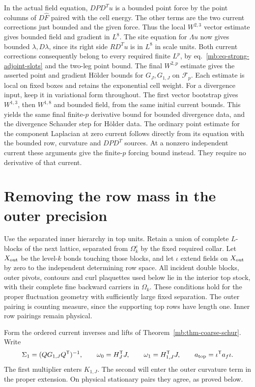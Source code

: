 \documentclass[11pt,letterpaper,reqno]{amsart}
\numberwithin{equation}{section}
\renewcommand{\eqref}[1]{\textup{eq.~\ref{#1}}}
\theoremstyle{definition}
\theoremstyle{remark}
\begin{document}
In the actual field equation, \(DPD^T u\) is a bounded point force by the point columns of \(D\widehat F\) paired with the cell energy. The other terms are the two current corrections just bounded and the given force. Thus the local \(W^{2,3}\) vector estimate gives bounded field and gradient in \(L^8\). The site equation for \(\Lambda u\) now gives bounded \(\lambda,D\lambda\), since its right side \(R D^T u\) is in \(L^8\) in scale units. Both current corrections consequently belong to every required finite \(L^p\), by \eqref{mb:eq-strong-adjoint-slots} and the two-leg point bound. The final \(W^{2,p}\) estimate gives the asserted point and gradient H\"older bounds for \(G_J,G_{1,J}\) on \(\mathcal F_p\). Each estimate is local on fixed boxes and retains the exponential cell weight. For a divergence input, keep it in variational form throughout. The first vector bootstrap gives \(W^{1,3}\), then \(W^{1,8}\) and bounded field, from the same initial current bounds. This yields the same final finite-\(p\) derivative bound for bounded divergence data, and the divergence Schauder step for H\"older data. The ordinary point estimate for the component Laplacian at zero current follows directly from its equation with the bounded row, curvature and \(DPD^T\) sources. At a nonzero independent current these arguments give the finite-\(p\) forcing bound instead. They require no derivative of that current.


\section{Removing the row mass in the outer precision}
\label{mb:sec-physical-gap}

Use the separated inner hierarchy in top units. Retain a
union of complete \(L\)-blocks of the next lattice, separated
from \(\Omega_k^c\) by the fixed required collar. Let \(X_{\rm out}\)
be the level-\(k\) bonds touching those blocks, and let
\(\iota\) extend fields on \(X_{\rm out}\) by zero to the
independent determining row space. All incident double
blocks, outer pivots, contours and curl plaquettes used
below lie in the interior top stock, with their complete
fine backward carriers in \(\Omega_k\). These conditions
hold for the proper fluctuation geometry with sufficiently
large fixed separation. The outer pairing is counting
measure, since the supporting top rows have length one.
Inner row pairings remain physical.

Form the ordered current inverses and lifts of
Theorem~\ref{mb:thm-coarse-schur}. Write
\[
 \Sigma_1=(QG_{1,J}Q^{\mathsf T})^{-1},\qquad
 \omega_0=H_J^{\mathsf T}J,\qquad
 \omega_1=H_{1,J}^{\mathsf T}J,\qquad
 a_{\rm top}=\iota^{\mathsf T}a_f\iota .
\]
The first multiplier enters \(K_{1,J}\). The second
will enter the outer curvature term in the proper
extension. On physical stationary pairs they agree,
as proved below.
\end{document}
